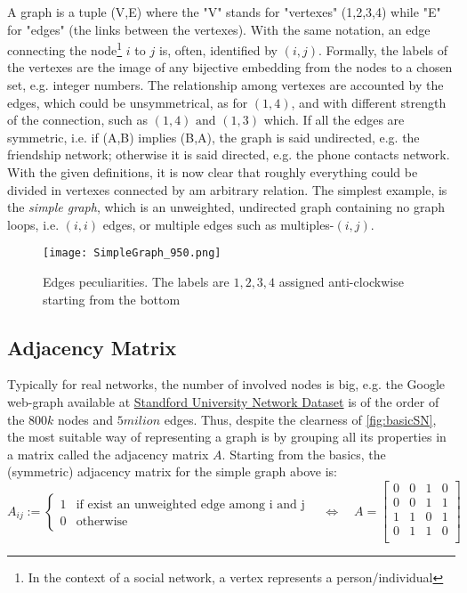 \documentclass[a4paper,10pt,twoside]{book} %
\theoremstyle{definition}
\begin{document}
A graph is a tuple (V,E) where the "V" stands for "vertexes" (1,2,3,4) while "E" for "edges" (the links between the vertexes).
With the same notation, an edge connecting the node\footnote{In the context of a social network, a vertex represents a person/individual} $i$ to $j$ is, often, identified by $(i,j)$.
Formally, the labels of the vertexes are the image of any bijective embedding from the nodes to a chosen set, e.g. integer numbers. The relationship among vertexes are accounted by the edges, which could be unsymmetrical, as for $(1,4)$, and with different strength of the connection, such as $(1,4) \text{ and } (1,3)$ which. If all the edges are symmetric, i.e. if (A,B) implies (B,A), the graph is said undirected, e.g. the friendship network; otherwise it is said directed, e.g. the phone contacts network. 
With the given definitions, it is now clear that roughly everything could be divided in vertexes connected by am arbitrary relation.
The simplest example, is the \textit{simple graph}, which is an unweighted, undirected graph containing no graph loops, i.e. $(i,i)$ edges, or multiple edges such as multiples-$(i,j)$.
\begin{figure}[ht]
	\texttt{[image: SimpleGraph\_950.png]}
	\caption{Edges peculiarities. The labels are $1,2,3,4$ assigned anti-clockwise starting from the bottom}
	\label{fig:simple}
\end{figure}
\newpage

\subsection{Adjacency Matrix}
Typically for real networks, the number of involved nodes is big, e.g. the Google web-graph available at \href{https://snap.stanford.edu/data/#socnets}{Standford University Network Dataset} is of the order of the $800k$ nodes and $5milion$ edges. Thus, despite the clearness of \autoref{fig:basicSN}, the most suitable way of representing a graph is by grouping all its properties in a matrix called the adjacency matrix $A$. 
Starting from the basics, the (symmetric) adjacency matrix for the simple graph above is:
\[
A_{ij} :=
\begin{cases}
1 & \text{if exist an unweighted edge among i and j} \\
0 & \text{otherwise}
\end{cases}
\quad
\Leftrightarrow
\quad
A = 
\begin{bmatrix}
0 & 0 & 1 & 0 \\
0 & 0 & 1 & 1 \\
1 & 1 & 0 & 1 \\
0 & 1 & 1 & 0 \\
\end{bmatrix}
\]
\end{document}
